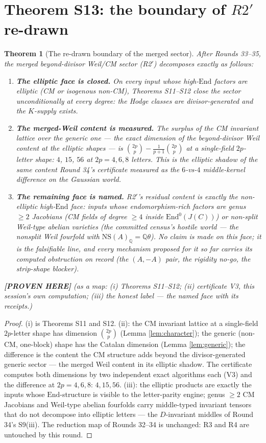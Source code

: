 \documentclass[11pt]{article}
\newtheorem{theorem}{Theorem}
\newcommand{\PROVEN}{\textbf{[PROVEN HERE]}}
\newcommand{\Q}{\mathbb{Q}}
\newcommand{\End}{\mathrm{End}}
\newcommand{\NS}{\mathrm{NS}}
\begin{document}
\section{Theorem S13: the boundary of \texorpdfstring{$R2'$}{R2'} re-drawn}

\begin{theorem}[The re-drawn boundary of the merged sector]\label{thm:s13}
After Rounds 33--35, the merged beyond-divisor Weil/CM sector (R2$'$)
decomposes exactly as follows:
\begin{enumerate}[label=(\roman*)]
\item \textbf{The elliptic face is closed.} On every input whose
high-$\End$ factors are elliptic (CM or isogenous non-CM), Theorems
S11--S12 close the sector unconditionally at every degree: the Hodge
classes are divisor-generated and the $K$-supply exists.
\item \textbf{The merged-Weil content is measured.} The surplus of the
CM invariant lattice over the generic one --- the exact dimension of the
beyond-divisor Weil content at the elliptic shapes --- is
$\binom{2p}{p}-\frac{1}{p+1}\binom{2p}{p}$ at a single-field $2p$-letter
shape: $4$, $15$, $56$ at $2p=4,6,8$ letters. This is the elliptic
shadow of the same content Round 34's certificate measured as the
$6$-vs-$4$ middle-kernel difference on the Gaussian world.
\item \textbf{The remaining face is named.} R2$'$'s residual content is
exactly the \emph{non-elliptic} high-$\End$ face: inputs whose
endomorphism-rich factors are genus $\ge2$ Jacobians (CM fields of
degree $\ge4$ inside $\End^0(J(C))$) or non-split Weil-type abelian
varieties (the committed census's hostile world --- the nonsplit Weil
fourfold with $\NS(A)_\Q=\Q\theta$). No claim is made on this face; it
is the falsifiable line, and every mechanism proposed for it so far
carries its computed obstruction on record (the $(A,-A)$ pair, the
rigidity no-go, the strip-shape blocker).
\end{enumerate}
\PROVEN{} (as a map: (i) Theorems S11--S12; (ii) certificate V3, this
session's own computation; (iii) the honest label --- the named face
with its receipts.)
\end{theorem}

\begin{proof}
(i) is Theorems S11 and S12. (ii): the CM invariant lattice at a
single-field $2p$-letter shape has dimension $\binom{2p}{p}$ (Lemma
\ref{lem:character}); the generic (non-CM, one-block) shape has the
Catalan dimension (Lemma \ref{lem:generic}); the difference is the
content the CM structure adds beyond the divisor-generated generic
sector --- the merged Weil content in its elliptic shadow. The
certificate computes both dimensions by two independent exact algorithms
each (V3) and the difference at $2p=4,6,8$: $4,15,56$.
(iii): the elliptic products are exactly the inputs whose
$\End$-structure is visible to the letter-parity engine; genus $\ge2$
CM Jacobians and Weil-type abelian fourfolds carry middle-typed
invariant tensors that do not decompose into elliptic letters --- the
$D$-invariant middles of Round 34's S9(iii). The reduction map of
Rounds 32--34 is unchanged: R3 and R4 are untouched by this round.
\end{proof}
\end{document}
